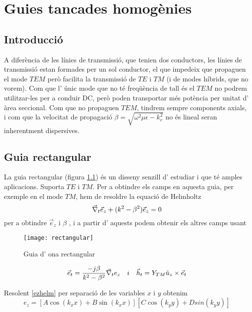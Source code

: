 \chapter{Guies tancades homogènies}

\section{Introducció}

A diferència de les línies de transmissió, que tenien dos conductors, les línies de transmissió estan formades per un sol conductor, el que impedeix que propaguen el mode $TEM$ però facilita la transmissió de $TE$ i $TM$ (i de modes híbrids, que no vorem). Com que l' únic mode que no té freqüència de tall és el $TEM$ no podrem utilitzar-les per a conduir DC, però poden transportar més potència per unitat d' àrea seccional. Com que no propaguen $TEM$, tindrem sempre components axials, i com que la velocitat de propagació $\beta = \sqrt{\omega ^2 \mu\epsilon - k_c ^2}$ no és lineal seran inherentment dispersives.

\section{Guia rectangular}

La guia rectangular (figura \cref{rectangular}) és un disseny senzill d' estudiar i que té amples aplicacions. Suporta $TE$ i $TM$. Per a obtindre els camps en aquesta guia, per exemple en el mode $TM$, hem de resoldre la equació de Helmholtz
\begin{equation}
  \label{ezhelm}
  \vec \nabla _t \vec e_z + (k^2 - \beta ^2) \vec e_z = 0
\end{equation}
per a obtindre $\vec e_z$ i $\beta$ , i a partir d' aquests podem obtenir els altres camps usant
\begin{figure}%
  \centering
  \texttt{[image: rectangular]}
  \caption{Guia d' ona rectangular}
  \label{rectangular}
  \vspace{-1 em}
\end{figure}

\begin{equation}
  \label{otherfields}
  \vec e_t = \frac{- j \beta}{k^2 - \beta ^2} \vec \nabla _t  e_z \quad i \quad \vec h_t = Y_{TM} \hat u_z \times \vec e_t
\end{equation}

Resolent \cref{ezhelm} per separació de les variables $x$ i $y$ obtenim
\begin{equation}
  e_z = \left[ A \cos (k_x x ) + B \sin (k_x x) \right ] \left[ C \cos(k_y y ) + Dsin(k_y y) \right]
\end{equation}

